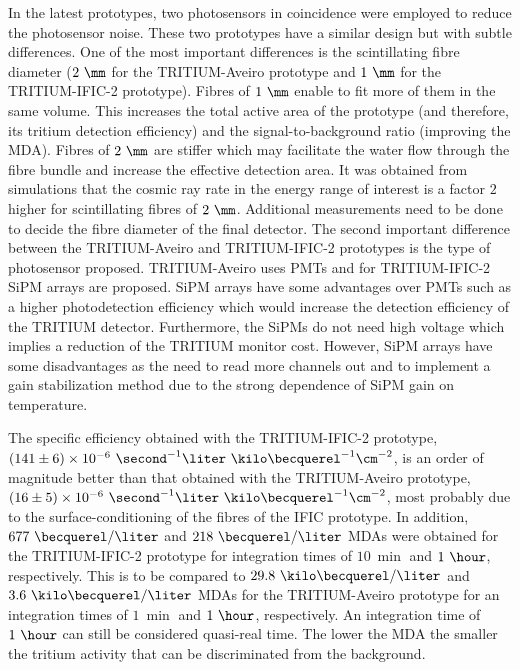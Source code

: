 \begin{enumerate}
In the latest prototypes, two photosensors in coincidence were employed to reduce the photosensor noise. These two prototypes have a similar design but with subtle differences. One of the most important differences is the scintillating fibre diameter ($2~\mm$ for the TRITIUM-Aveiro prototype and $1~\mm$ for the TRITIUM-IFIC-2 prototype). Fibres of $1~\mm$ enable to fit more of them in the same volume. This increases the total active area of the prototype (and therefore, its tritium detection efficiency) and the signal-to-background ratio (improving the MDA). Fibres of $2~\mm$ are stiffer which may facilitate the water flow through the fibre bundle and increase the effective detection area. It was obtained from simulations that the cosmic ray rate in the energy range of interest is a factor $2$ higher for scintillating fibres of $2~\mm$. Additional measurements need to be done to decide the fibre diameter of the final detector. The second important difference between the TRITIUM-Aveiro and TRITIUM-IFIC-2 prototypes is the type of photosensor proposed. TRITIUM-Aveiro uses PMTs and for TRITIUM-IFIC-2 SiPM arrays are proposed. SiPM arrays have some advantages over PMTs such as a higher photodetection efficiency which would increase the detection efficiency of the TRITIUM detector. Furthermore, the SiPMs do not need high voltage which implies a reduction of the TRITIUM monitor cost. However, SiPM arrays have some disadvantages as the need to read more channels out and to implement a gain stabilization method due to the strong dependence of SiPM gain on temperature.

The specific efficiency obtained with the TRITIUM-IFIC-2 prototype, $(141 \pm 6) \times 10^{-6}~ \second^{-1}  \liter ~ \kilo\becquerel^{-1} \cm^{-2}$, is an order of magnitude better than that obtained with the TRITIUM-Aveiro prototype, $(16 \pm 5)\times 10^{-6}~ \second^{-1}  \liter ~ \kilo\becquerel^{-1} \cm^{-2}$, most probably due to the surface-conditioning of the fibres of the IFIC prototype. In addition, $677~\becquerel/\liter$ and $218~\becquerel/\liter$ MDAs were obtained for the TRITIUM-IFIC-2 prototype for integration times of $10~\min$ and $1~\hour$, respectively. This is to be compared to $29.8~\kilo\becquerel/\liter$ and $3.6~\kilo\becquerel/\liter$ MDAs for the TRITIUM-Aveiro prototype for an integration times of $1~\min$ and $1~\hour$, respectively. An integration time of $1~\hour$ can still be considered quasi-real time. The lower the MDA the smaller the tritium activity that can be discriminated from the background.


\end{enumerate}
